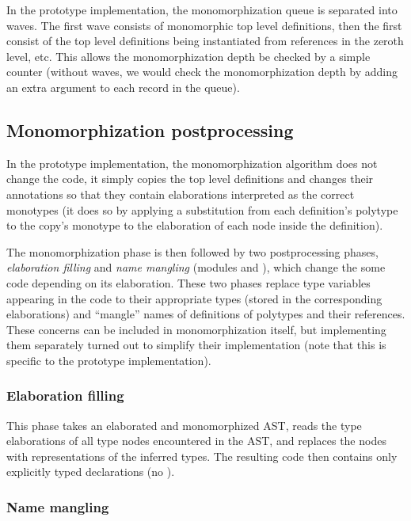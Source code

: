 In the prototype implementation, the monomorphization queue is separated into waves. The first wave consists of monomorphic top level definitions, then the first consist of the top level definitions being instantiated from references in the zeroth level, etc. This allows the monomorphization depth be checked by a simple counter (without waves, we would check the monomorphization depth by adding an extra argument to each record in the queue).

\subsection{Monomorphization postprocessing}

In the prototype implementation, the monomorphization algorithm does not change the code, it simply copies the top level definitions and changes their annotations so that they contain elaborations interpreted as the correct monotypes (it does so by applying a substitution from each definition's polytype to the copy's monotype to the elaboration of each node inside the definition).

The monomorphization phase is then followed by two postprocessing phases, \emph{elaboration filling} and \emph{name mangling} (modules  and ), which change the some code depending on its elaboration. These two phases replace type variables appearing in the code to their appropriate types (stored in the corresponding elaborations) and ``mangle'' names of definitions of polytypes and their references. These concerns can be included in monomorphization itself, but implementing them separately turned out to simplify their implementation (note that this is specific to the prototype implementation).

\subsubsection{Elaboration filling}

This phase takes an elaborated and monomorphized AST, reads the type elaborations of all type nodes encountered in the AST, and replaces the nodes with representations of the inferred types. The resulting code then contains only explicitly typed declarations (no ).

\subsubsection{Name mangling}
\label{sec:mangling}

